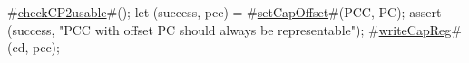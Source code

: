 #\hyperref[sailMIPSzcheckCP2usable]{checkCP2usable}#();
let (success, pcc) = #\hyperref[sailMIPSzsetCapOffset]{setCapOffset}#(PCC, PC);
assert (success, "PCC with offset PC should always be representable");
#\hyperref[sailMIPSzwriteCapReg]{writeCapReg}#(cd, pcc);
